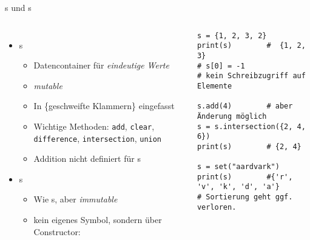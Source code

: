 \begin{frame}[fragile]{s und s}
%
\begin{columns}[T]
\begin{itemize}
\item {}s
	\begin{itemize}
	\item Datencontainer für \emph{eindeutige Werte}
	\item \emph{mutable}
	\item In \{geschweifte Klammern\} eingefasst
	\item Wichtige Methoden: \texttt{add}, \texttt{clear}, \texttt{difference}, \texttt{intersection}, \texttt{union}
	\item Addition nicht definiert für s
	\end{itemize}
\item {}s
	\begin{itemize}
	\item Wie s, aber \emph{immutable}
	\item kein eigenes Symbol, sondern über Constructor: 
	\end{itemize}
\end{itemize}
%
\begin{codebox}
\begin{verbatim}
s = {1, 2, 3, 2}
print(s)        #  {1, 2, 3}
# s[0] = -1     
# kein Schreibzugriff auf Elemente

s.add(4)        # aber Änderung möglich
s = s.intersection({2, 4, 6})
print(s)        # {2, 4}

s = set("aardvark")
print(s)        #{'r', 'v', 'k', 'd', 'a'}
# Sortierung geht ggf. verloren.
\end{verbatim}
\end{codebox}
\end{columns}
%
\end{frame}


